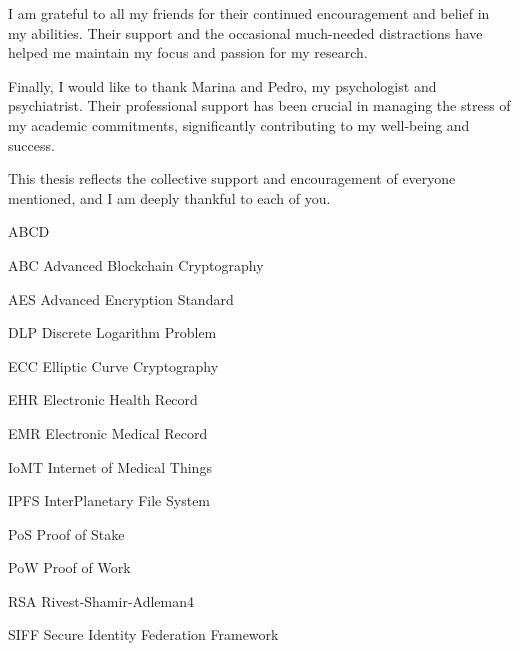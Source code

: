 \documentclass[cic,tc,english]{iiufrgs}
\begin{document}
    I am grateful to all my friends for their continued encouragement and belief
    in my abilities. Their support and the occasional much-needed distractions 
    have helped me maintain my focus and passion for my research.

    Finally, I would like to thank Marina and Pedro, my psychologist and 
    psychiatrist. Their professional support has been crucial in managing the 
    stress of my academic commitments, significantly contributing to my 
    well-being and success.

    This thesis reflects the collective support and encouragement of everyone 
    mentioned, and I am deeply thankful to each of you.

\begin{abstract}
    \lipsum[1]
\end{abstract}

\begin{translatedabstract}
    \lipsum[1]
\end{translatedabstract}



\begin{listofabbrv}{ABCD} %
    \item[ABC] Advanced Blockchain Cryptography
    \item[AES] Advanced Encryption Standard
    \item[DLP] Discrete Logarithm Problem
    \item[ECC] Elliptic Curve Cryptography
    \item[EHR] Electronic Health Record
    \item[EMR] Electronic Medical Record
    \item[IoMT] Internet of Medical Things
    \item[IPFS] InterPlanetary File System 
    \item[PoS] Proof of Stake
    \item[PoW] Proof of Work
    \item[RSA] Rivest-Shamir-Adleman4
    \item[SIFF] Secure Identity Federation Framework
\end{listofabbrv}

\end{document}
